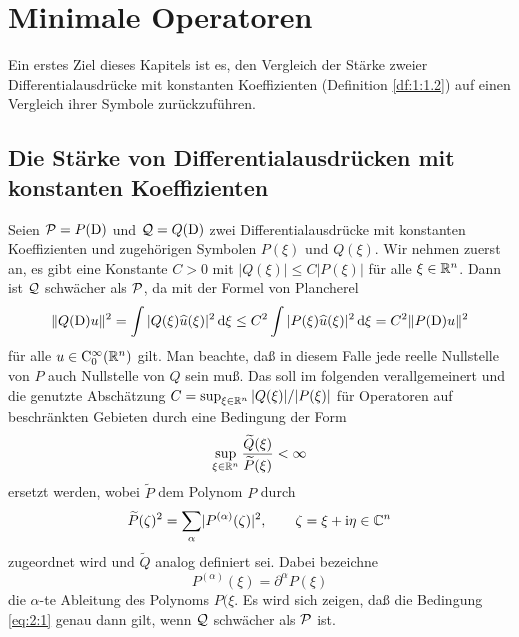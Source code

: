 \chapter{Minimale Operatoren}

Ein erstes Ziel dieses Kapitels ist es, den Vergleich der Stärke
zweier Differentialausdrücke mit konstanten Koeffizienten  (Definition \ref{df:1:1.2})  auf einen Vergleich ihrer Symbole zurückzuführen. 

\section{Die Stärke von Differentialausdrücken mit konstanten Koeffizienten}

Seien $\mathcal P=P(\mathrm D)$ und $\mathcal Q=Q(\mathrm D)$ zwei Differentialausdrücke mit konstanten Koeffizienten und zugehörigen Symbolen $P(\xi)$ und $Q(\xi)$. Wir nehmen zuerst an, es gibt eine Konstante $C>0$ mit $|Q(\xi)|\le C|P(\xi)|$ für alle $\xi\in\mathbb R^n$. Dann ist $\mathcal Q$ schwächer als $\mathcal P$, da mit der Formel von Plancherel 
\begin{equation}
    \|Q(\mathrm D) u\|^2 = \int |Q(\xi)\widehat u(\xi)|^2 \,\mathrm d\xi \le C^2 \int |P(\xi)\widehat u(\xi)|^2 \,\mathrm d\xi = C^2 \|P(\mathrm D)u \|^2 
\end{equation}
für alle $u\in\mathrm C_0^\infty(\mathbb R^n)$ gilt. Man beachte, daß in diesem Falle jede reelle Nullstelle von $P$ auch Nullstelle von $Q$ sein muß. Das soll im folgenden verallgemeinert und die genutzte Abschätzung $C=\sup_{\xi\in\mathbb R^n} |Q(\xi)|/|P(\xi)|$ für Operatoren auf beschränkten Gebieten  durch eine Bedingung der Form
\begin{equation}\label{eq:2:1}
\sup_{\xi\in\mathbb R^n}\frac{\widetilde{Q}(\xi)}{\widetilde{P}(\xi)}<\infty
\end{equation}
ersetzt werden, wobei $\widetilde{P}$ dem Polynom $P$ durch
\begin{equation}\label{eq:2:2}
\widetilde{P}(\zeta)^2=\sum_\alpha\lvert P^{(\alpha)}(\zeta)\rvert^2,\qquad \zeta=\xi+\mathrm i\eta \in\mathbb C^n
\end{equation}
zugeordnet wird und $\widetilde Q$ analog definiert sei. Dabei bezeichne 
\begin{equation}
P^{(\alpha)}(\xi)=\partial^\alpha P(\xi)
\end{equation}
die $\alpha$-te Ableitung des Polynoms $P(\xi$. Es wird sich zeigen, daß die Bedingung \eqref{eq:2:1} genau dann gilt, wenn $\mathcal Q$ schwächer als $\mathcal P$ ist.

